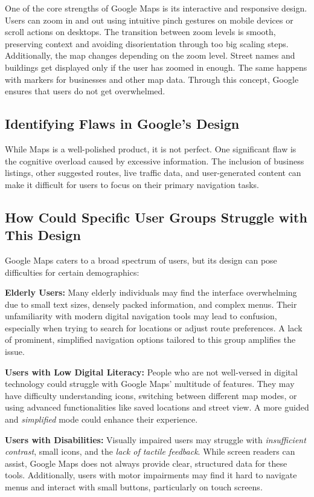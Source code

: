 \blankLine

One of the core strengths of Google Maps is its interactive and responsive design. Users can zoom in and out using intuitive pinch gestures on mobile devices or scroll actions on desktops. The transition between zoom levels is smooth, preserving context and avoiding disorientation through too big scaling steps. Additionally, the map changes depending on the zoom level. Street names and buildings get displayed only if the user has zoomed in enough. The same happens with markers for businesses and other map data. Through this concept, Google ensures that users do not get overwhelmed. \autocite{battersby2008user}

\subsection{Identifying Flaws in Google's Design}

While Maps is a well-polished product, it is not perfect. One significant flaw is the cognitive overload caused by excessive information. The inclusion of business listings, other suggested routes, live traffic data, and user-generated content can make it difficult for users to focus on their primary navigation tasks. \autocite{battersby2008user}

\subsection{How Could Specific User Groups Struggle with This Design}

Google Maps caters to a broad spectrum of users, but its design can pose difficulties for certain demographics:
\blankLine

\textbf{Elderly Users:} Many elderly individuals may find the interface overwhelming due to small text sizes, densely packed information, and complex menus. Their unfamiliarity with modern digital navigation tools may lead to confusion, especially when trying to search for locations or adjust route preferences. A lack of prominent, simplified navigation options tailored to this group amplifies the issue. \autocite{allyant2022google}

\textbf{Users with Low Digital Literacy:} People who are not well-versed in digital technology could struggle with Google Maps' multitude of features. They may have difficulty understanding icons, switching between different map modes, or using advanced functionalities like saved locations and street view. A more guided and \textit{simplified} mode could enhance their experience.

\textbf{Users with Disabilities:} Visually impaired users may struggle with \textit{insufficient contrast}, small icons, and the \textit{lack of tactile feedback}. While screen readers can assist, Google Maps does not always provide clear, structured data for these tools. Additionally, users with motor impairments may find it hard to navigate menus and interact with small buttons, particularly on touch screens. \autocite{froehlich2019grand}
